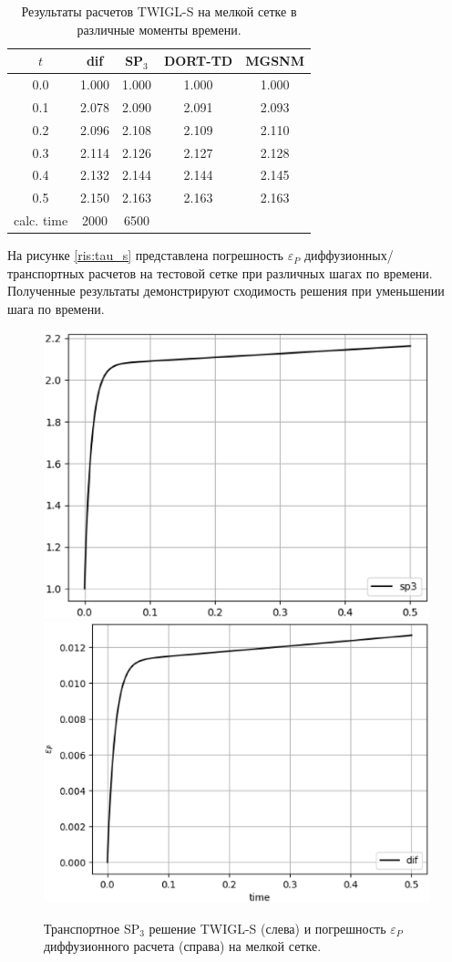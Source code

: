 \documentclass{crm-article}
\begin{document}
\begin{table}[ht]
\caption{Результаты расчетов TWIGL-S на мелкой сетке в различные моменты времени.}
\label{table:twigl-s}
\begin{center}
\begin{tabular}{c c c c c}
\hline
$t$ & dif & SP$_3$ & DORT-TD & MGSNM \\
\hline
0.0 & 1.000 & 1.000 & 1.000 & 1.000 \\
0.1 & 2.078 & 2.090 & 2.091 & 2.093 \\
0.2 & 2.096 & 2.108 & 2.109 & 2.110 \\
0.3 & 2.114 & 2.126 & 2.127 & 2.128 \\
0.4 & 2.132 & 2.144 & 2.144 & 2.145 \\
0.5 & 2.150 & 2.163 & 2.163 & 2.163 \\
\hline
calc. time & 2000 & 6500  \\
\end{tabular}
\end{center}
\end{table}

На рисунке \ref{ris:tau_s} представлена погрешность $\varepsilon_P$ диффузионных/транспортных расчетов на тестовой сетке при различных шагах по времени. 
Полученные результаты демонстрируют сходимость решения при уменьшении шага по времени.

\begin{figure}[ht]
\begin{center}
	\includegraphics[width=0.4\linewidth]{sp3_ref_s.eps}\hspace{20pt}
	\includegraphics[width=0.4\linewidth]{odds_s.eps}\\
	\caption{\label{image:canonsummary} Транспортное SP$_3$ решение TWIGL-S (слева) и погрешность $\varepsilon_P$ диффузионного расчета (справа) на мелкой сетке.}
	\label{ris:sp3_ref_s}
\end{center}
\end{figure}
\end{document}
